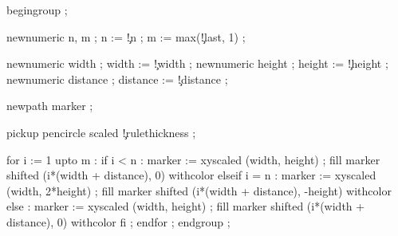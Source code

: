 

  begingroup ;

  newnumeric n, m ;
  n := \visualcounterparameter\c!n ;
  m := max(\visualcounterparameter\c!last, 1) ;

  newnumeric width    ; width    := \visualcounterparameter\c!width    ;
  newnumeric height   ; height   := \visualcounterparameter\c!height   ;
  newnumeric distance ; distance := \visualcounterparameter\c!distance ;

  newpath marker ;

  pickup pencircle scaled \visualcounterparameter\c!rulethickness ;

  for i := 1 upto m :
          if i < n     : marker :=  xyscaled (width, height) ;
			 fill marker  shifted (i*(width + distance), 0) withcolor  
          elseif i = n : marker :=  xyscaled (width, 2*height) ;
			 fill marker  shifted (i*(width + distance), -height) withcolor 
          else         : marker :=  xyscaled (width, height) ;
 			 fill marker  shifted (i*(width + distance), 0) withcolor 
          fi ;
  endfor ;
  endgroup ;
\stopuseMPgraphic

% 
% 
% 
% 
% 

